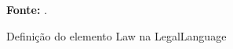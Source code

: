 \begin{figure}[ht!]
\centering

\caption{\textmd{Definição do elemento Law na LegalLanguage}}
\label{fig:xtextlegal}

\par\medskip\textbf{Fonte:} \cite{legallanguage}. \par\medskip

\end{figure}

